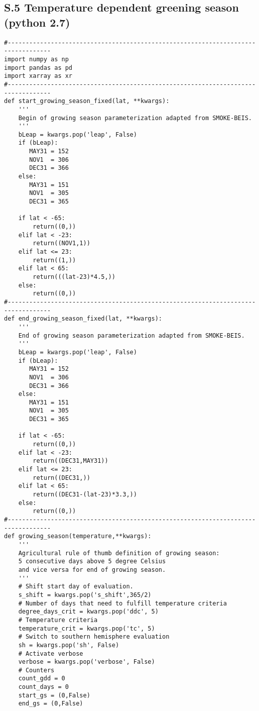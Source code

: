 \documentclass[manuscript]{copernicus}
\begin{document}
\subsection*{S.5 Temperature dependent greening season (python 2.7)}
{\scriptsize
\begin{verbatim}
#----------------------------------------------------------------------------------
import numpy as np
import pandas as pd
import xarray as xr
#----------------------------------------------------------------------------------
def start_growing_season_fixed(lat, **kwargs):
    '''
    Begin of growing season parameterization adapted from SMOKE-BEIS.
    '''
    bLeap = kwargs.pop('leap', False)
    if (bLeap):
       MAY31 = 152
       NOV1  = 306
       DEC31 = 366
    else:
       MAY31 = 151
       NOV1  = 305
       DEC31 = 365
    
    if lat < -65:
        return((0,))
    elif lat < -23:
        return((NOV1,1))
    elif lat <= 23:
        return((1,))
    elif lat < 65:
        return(((lat-23)*4.5,))
    else:
        return((0,))
#----------------------------------------------------------------------------------
def end_growing_season_fixed(lat, **kwargs):
    '''
    End of growing season parameterization adapted from SMOKE-BEIS.
    '''
    bLeap = kwargs.pop('leap', False)
    if (bLeap):
       MAY31 = 152
       NOV1  = 306
       DEC31 = 366
    else:
       MAY31 = 151
       NOV1  = 305
       DEC31 = 365
       
    if lat < -65:
        return((0,))
    elif lat < -23:
        return((DEC31,MAY31))
    elif lat <= 23:
        return((DEC31,))
    elif lat < 65:
        return((DEC31-(lat-23)*3.3,))
    else:
        return((0,))
#----------------------------------------------------------------------------------
def growing_season(temperature,**kwargs):
    '''
    Agricultural rule of thumb definition of growing season:
    5 consecutive days above 5 degree Celsius 
    and vice versa for end of growing season.
    '''
    # Shift start day of evaluation.
    s_shift = kwargs.pop('s_shift',365/2)
    # Number of days that need to fulfill temperature criteria
    degree_days_crit = kwargs.pop('ddc', 5)
    # Temperature criteria
    temperature_crit = kwargs.pop('tc', 5)
    # Switch to southern hemisphere evaluation
    sh = kwargs.pop('sh', False)
    # Activate verbose
    verbose = kwargs.pop('verbose', False)
    # Counters
    count_gdd = 0
    count_days = 0
    start_gs = (0,False)
    end_gs = (0,False)
    

\end{verbatim}}
\end{document}
